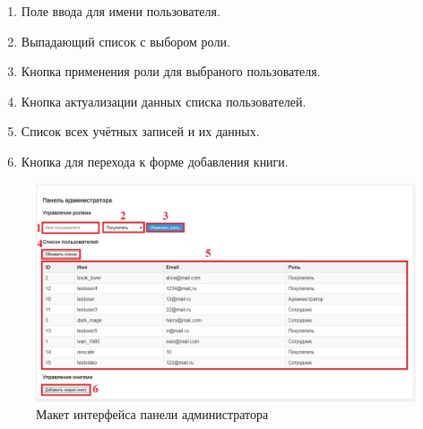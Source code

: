 \begin{enumerate}
	\item Поле ввода для имени пользователя.
	\item Выпадающий список с выбором роли.
	\item Кнопка применения роли для выбраного пользователя.
	\item Кнопка актуализации данных списка пользователей.
	\item Список всех учётных записей и их данных.
	\item Кнопка для перехода к форме добавления книги.
\end{enumerate}

\begin{figure}[H]
	\centering
	\includegraphics[width=0.7\linewidth]{images/Панель_администратора}
	\caption{Макет интерфейса панели администратора}
	\label{fig:}
\end{figure}

